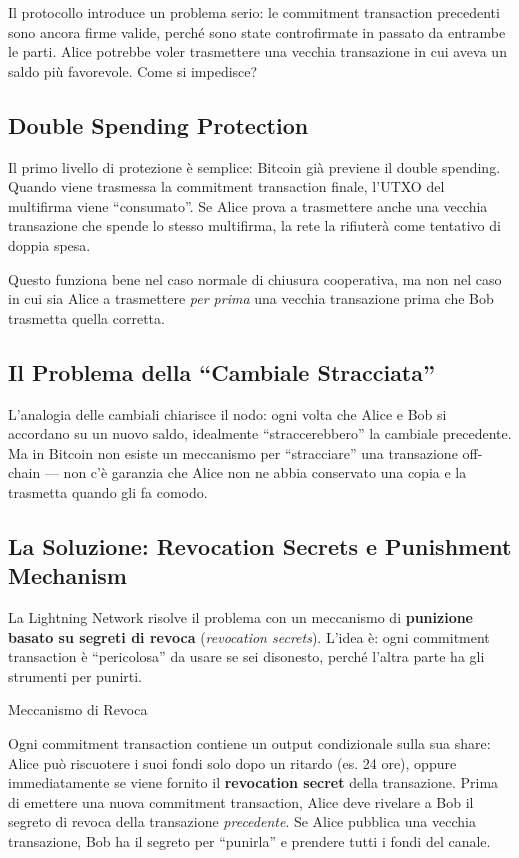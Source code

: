 \documentclass[
  italian,
  openany]{book}
\begin{document}
Il protocollo introduce un problema serio: le commitment transaction
precedenti sono ancora firme valide, perché sono state controfirmate in
passato da entrambe le parti. Alice potrebbe voler trasmettere una
vecchia transazione in cui aveva un saldo più favorevole. Come si
impedisce?

\subsection{Double Spending
Protection}\label{double-spending-protection}

Il primo livello di protezione è semplice: Bitcoin già previene il
double spending. Quando viene trasmessa la commitment transaction
finale, l'UTXO del multifirma viene ``consumato''. Se Alice prova a
trasmettere anche una vecchia transazione che spende lo stesso
multifirma, la rete la rifiuterà come tentativo di doppia spesa.

Questo funziona bene nel caso normale di chiusura cooperativa, ma non
nel caso in cui sia Alice a trasmettere \emph{per prima} una vecchia
transazione prima che Bob trasmetta quella corretta.

\subsection{Il Problema della ``Cambiale
Stracciata''}\label{il-problema-della-cambiale-stracciata}

L'analogia delle cambiali chiarisce il nodo: ogni volta che Alice e Bob
si accordano su un nuovo saldo, idealmente ``straccerebbero'' la
cambiale precedente. Ma in Bitcoin non esiste un meccanismo per
``stracciare'' una transazione off-chain --- non c'è garanzia che Alice
non ne abbia conservato una copia e la trasmetta quando gli fa comodo.

\subsection{La Soluzione: Revocation Secrets e Punishment
Mechanism}\label{la-soluzione-revocation-secrets-e-punishment-mechanism}

La Lightning Network risolve il problema con un meccanismo di
\textbf{punizione basato su segreti di revoca} (\emph{revocation
secrets}). L'idea è: ogni commitment transaction è ``pericolosa'' da
usare se sei disonesto, perché l'altra parte ha gli strumenti per
punirti.

\begin{calloutdefinition}{Meccanismo di Revoca}

Ogni commitment transaction contiene un output condizionale sulla sua
share: Alice può riscuotere i suoi fondi solo dopo un ritardo (es. 24
ore), oppure immediatamente se viene fornito il \textbf{revocation
secret} della transazione. Prima di emettere una nuova commitment
transaction, Alice deve rivelare a Bob il segreto di revoca della
transazione \emph{precedente}. Se Alice pubblica una vecchia
transazione, Bob ha il segreto per ``punirla'' e prendere tutti i fondi
del canale.

\end{calloutdefinition}
\end{document}
